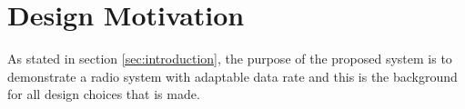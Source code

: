 \section{Design Motivation}
\label{sec:design_motivation}

As stated in section \ref{sec:introduction}, the purpose of the proposed system is to demonstrate a radio system with adaptable data rate and this is the background for all design choices that is made. 